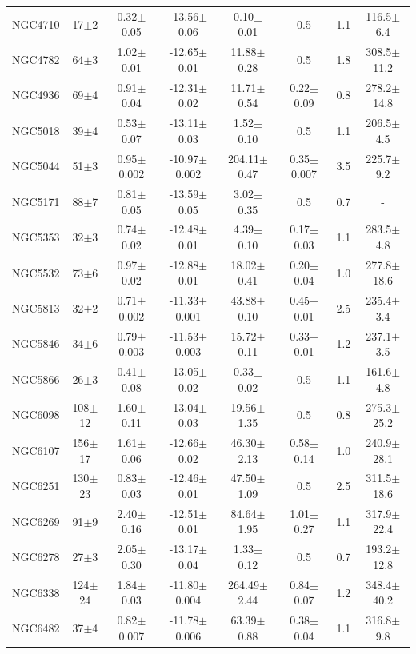 \documentclass[iop]{emulateapj}
\begin{document}
\begin{table}
\begin{tabular}{lccccccc}
NGC4710 & 17$\pm$2 & 0.32$\pm$0.05 & -13.56$\pm$0.06 & 0.10$\pm$0.01 & 0.5 & 1.1  & 116.5$\pm$6.4 \\
NGC4782 & 64$\pm$3 & 1.02$\pm$0.01 & -12.65$\pm$0.01 & 11.88$\pm$0.28 & 0.5 & 1.8  & 308.5$\pm$11.2 \\
NGC4936 & 69$\pm$4 & 0.91$\pm$0.04 & -12.31$\pm$0.02  & 11.71$\pm$0.54  & 0.22$\pm$0.09 & 0.8  & 278.2$\pm$14.8\\
NGC5018 & 39$\pm$4 & 0.53$\pm$0.07 & -13.11$\pm$0.03  & 1.52$\pm$0.10  & 0.5 & 1.1  & 206.5$\pm$4.5\\  
NGC5044 & 51$\pm$3 & 0.95$\pm$0.002 & -10.97$\pm$0.002 & 204.11$\pm$0.47 & 0.35$\pm$0.007 & 3.5 & 225.7$\pm$9.2 \\
NGC5171 & 88$\pm$7 & 0.81$\pm$0.05 & -13.59$\pm$0.05  & 3.02$\pm$0.35 & 0.5 & 0.7  & -\\
NGC5353 & 32$\pm$3 & 0.74$\pm$0.02 & -12.48$\pm$0.01 & 4.39$\pm$0.10 & 0.17$\pm$0.03 & 1.1  & 283.5$\pm$4.8\\
NGC5532 & 73$\pm$6 & 0.97$\pm$0.02 & -12.88$\pm$0.01 & 18.02$\pm$0.41 & 0.20$\pm$0.04 & 1.0  & 277.8$\pm$18.6\\
NGC5813 & 32$\pm$2 & 0.71$\pm$0.002 & -11.33$\pm$0.001 & 43.88$\pm$0.10 & 0.45$\pm$0.01 & 2.5  & 235.4$\pm$3.4 \\
NGC5846 & 34$\pm$6 & 0.79$\pm$0.003 & -11.53$\pm$0.003 & 15.72$\pm$0.11 & 0.33$\pm$0.01 & 1.2  & 237.1$\pm$3.5 \\
NGC5866 & 26$\pm$3 & 0.41$\pm$0.08 & -13.05$\pm$0.02 & 0.33$\pm$0.02 & 0.5 & 1.1  & 161.6$\pm$4.8 \\
NGC6098 & 108$\pm$12 & 1.60$\pm$0.11 & -13.04$\pm$0.03 & 19.56$\pm$1.35 & 0.5 & 0.8  & 275.3$\pm$25.2\\
NGC6107 & 156$\pm$17 & 1.61$\pm$0.06 & -12.66$\pm$0.02  & 46.30$\pm$2.13 & 0.58$\pm$0.14 &  1.0  & 240.9$\pm$28.1 \\
NGC6251 & 130$\pm$23 & 0.83$\pm$0.03 & -12.46$\pm$0.01 & 47.50$\pm$1.09 & 0.5 & 2.5  & 311.5$\pm$18.6\\
NGC6269 & 91$\pm$9 & 2.40$\pm$0.16 & -12.51$\pm$0.01 & 84.64$\pm$1.95 & 1.01$\pm$0.27 & 1.1  & 317.9$\pm$22.4\\
NGC6278 & 27$\pm$3 & 2.05$\pm$0.30 & -13.17$\pm$0.04 & 1.33$\pm$0.12 & 0.5 & 0.7  & 193.2$\pm$12.8 \\
NGC6338 & 124$\pm$24 & 1.84$\pm$0.03 & -11.80$\pm$0.004 & 264.49$\pm$2.44 & 0.84$\pm$0.07 & 1.2  & 348.4$\pm$40.2\\
NGC6482 & 37$\pm$4 & 0.82$\pm$0.007 & -11.78$\pm$0.006 & 63.39$\pm$0.88 & 0.38$\pm$0.04 & 1.1  & 316.8$\pm$9.8\\

\end{tabular}
\end{table}
\end{document}
